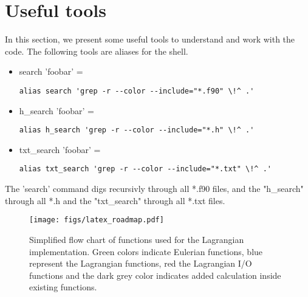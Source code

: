 \documentclass[12pt]{article}
\begin{document}
\section{Useful tools}
\label{sec:tools}
\FloatBarrier
In this section, we present some useful tools to understand and work with the code. The following tools are aliases for the shell. 
\begin{itemize}
	\item search 'foobar' = \begin{verbatim}alias search 'grep -r --color --include="*.f90" \!^ .' \end{verbatim}
	\item h\_search 'foobar' = \begin{verbatim}alias h_search 'grep -r --color --include="*.h" \!^ .'	 \end{verbatim}
	\item txt\_search 'foobar' = \begin{verbatim}alias txt_search 'grep -r --color --include="*.txt" \!^ .' \end{verbatim}
\end{itemize}
The 'search' command digs recursivly through all *.f90 files, and the "h\_search" through all *.h and the "txt\_search" through all *.txt files.
\begin{figure}[htbp]
	\centering
			\texttt{[image: figs/latex\_roadmap.pdf]}
	\caption[Implementation flow chart]{Simplified flow chart of functions used for the Lagrangian implementation. Green colors indicate Eulerian functions, blue represent the Lagrangian functions, red the Lagrangian I/O functions and the dark grey color indicates added calculation inside existing functions.}
	\label{fig:roadmap}
\end{figure}

\end{document}

